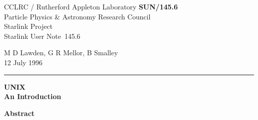 \documentclass[twoside,11pt]{article}
\newcommand{\stardoccategory}  {Starlink User Note}
\newcommand{\stardocinitials}  {SUN}
\newcommand{\stardocnumber}    {145.6}
\newcommand{\stardocauthors}   {M D Lawden, G R Mellor, B Smalley}
\newcommand{\stardocdate}      {12 July 1996}
\newcommand{\stardoctitle}     {UNIX\\An Introduction}
\newcommand{\stardocname}{\stardocinitials /\stardocnumber}
\newenvironment{latexonly}{}{}
\begin{document}
\thispagestyle{empty}

\begin{latexonly}
   {\small CCLRC / {\sc Rutherford Appleton Laboratory} \hfill {\bf \stardocname}}\\
   {Particle Physics \& Astronomy Research Council}\\
   {Starlink Project\\}
   {\stardoccategory\ \stardocnumber}
   \begin{flushright}
   \stardocauthors\\
   \stardocdate
   \end{flushright}
   \vspace{-4mm}
   \rule{\textwidth}{0.5mm}
   \vspace{5mm}
   \begin{center}
   {\Huge\bf  \stardoctitle \\ [2.5ex]}
   \end{center}
   \vspace{5mm}

   \vspace{10mm}
   \begin{center}
      {\Large\bf Abstract}
   \end{center}
\end{latexonly}
\end{document}
